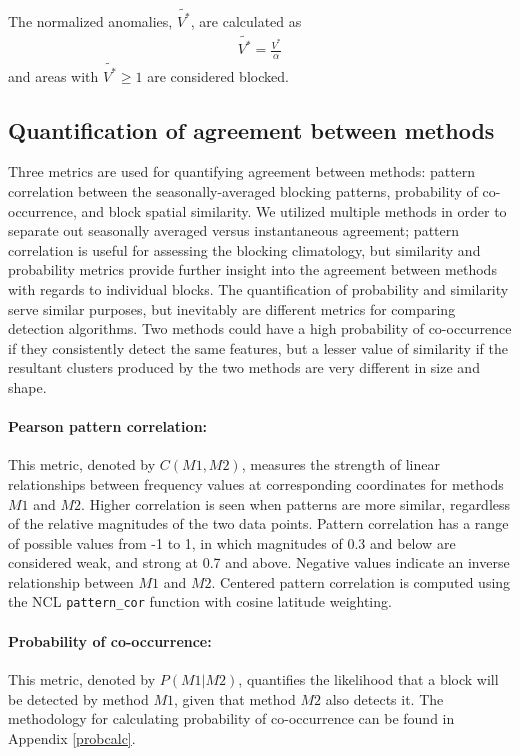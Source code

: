 \documentclass[smallextended]{svjour3}       %
\numberwithin{equation}{section}
\begin{document}
The normalized anomalies, $\widetilde{V^*}$, are calculated as
 \begin{eqnarray}
 \widetilde{V^*} = \frac{V^*}{\alpha}
 \end{eqnarray}
\noindent 
and areas with $\widetilde{V^*}\geq 1$ are considered blocked.

\subsection{Quantification of agreement between methods}\label{simsec}

Three metrics are used for quantifying agreement between methods: 
pattern correlation between the seasonally-averaged blocking patterns, probability of co-occurrence, and block spatial similarity.  We utilized multiple methods in order to separate out seasonally averaged versus instantaneous agreement; pattern correlation is useful for assessing the blocking climatology, but similarity and probability metrics provide further insight into the agreement between methods with regards to individual blocks. The quantification of probability and similarity serve similar purposes, but inevitably are different metrics for comparing detection algorithms. Two methods could have a high probability of co-occurrence if they consistently detect the same features, but a lesser value of similarity if the resultant clusters produced by the two methods are very different in size and shape.

\paragraph{Pearson pattern correlation:} This metric, denoted by $C(M1,M2)$, measures the strength of linear relationships between  frequency values at corresponding coordinates for methods $M1$ and $M2$. Higher correlation is seen when patterns are more similar, regardless of the relative magnitudes of the two data points. Pattern correlation has a range of possible values from -1 to 1, in which magnitudes of 0.3 and below are considered weak, and strong at 0.7 and above. Negative values indicate an inverse relationship between $M1$ and $M2$. Centered pattern correlation is computed using the NCL \texttt{pattern\_cor} function with cosine latitude weighting.

\paragraph{Probability of co-occurrence:} This metric, denoted by $P(M1|M2)$, quantifies the likelihood that a block will be detected by method $M1$, given that method $M2$ also detects it. The methodology for calculating probability of co-occurrence can be found in Appendix \ref{probcalc}. 
\end{document}
